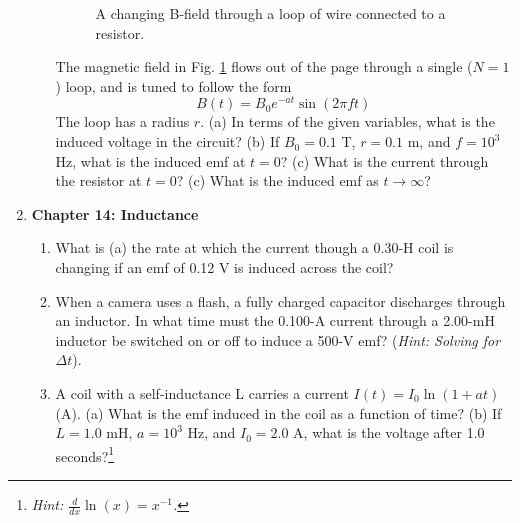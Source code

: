 \documentclass[10pt]{article}
\begin{document}
\begin{enumerate}
\begin{enumerate}
\begin{figure}
\caption{\label{fig:flux2} A changing B-field through a loop of wire connected to a resistor.}
\end{figure} 
The magnetic field in Fig. \ref{fig:flux2} flows out of the page through a single ($N=1$) loop, and is tuned to follow the form
\begin{equation}
B(t) = B_0 e^{-at}\sin(2\pi f t)
\end{equation}
The loop has a radius $r$.  (a) In terms of the given variables, what is the induced voltage in the circuit? (b) If $B_0 = 0.1$ T, $r = 0.1$ m, and $f = 10^3$ Hz, what is the induced emf at $t=0$?  (c) What is the current through the resistor at $t=0$? (c) What is the induced emf as $t \to \infty$? \\ \vspace{4cm}
\end{enumerate}
\item \textbf{Chapter 14: Inductance}
\begin{enumerate}
\item What is (a) the rate at which the current though a 0.30-H coil is changing if an emf of 0.12 V is induced across the coil?\\ \vspace{1cm}
\item When a camera uses a flash, a fully charged capacitor discharges through an inductor. In what time must the 0.100-A current through a 2.00-mH inductor be switched on or off to induce a 500-V emf? (\textit{Hint: Solving for $\Delta t$}). \\ \vspace{1cm}
\item A coil with a self-inductance L carries a current $I(t) = I_0\ln(1+at)$ (A).  (a) What is the emf induced in the coil as a function of time? (b) If $L = 1.0$ mH, $a = 10^3$ Hz, and $I_0 = 2.0$ A, what is the voltage after 1.0 seconds?\footnote{\textit{Hint: $\frac{d}{dx} \ln(x) = x^{-1}$.}} \\ \vspace{4cm}
\end{enumerate}
\end{enumerate}
\end{document}
